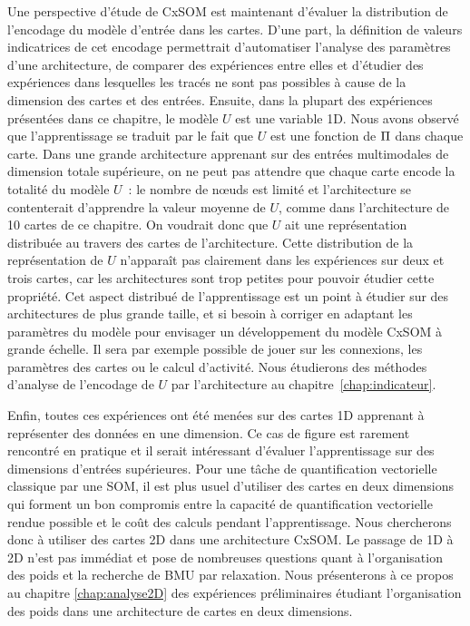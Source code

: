 \documentclass[../main]{subfiles}
\begin{document}
Une perspective d'étude de CxSOM est maintenant d'évaluer la distribution de l'encodage du modèle d'entrée dans les cartes. 
D'une part, la définition de valeurs indicatrices de cet encodage permettrait d'automatiser l'analyse des paramètres d'une architecture, de comparer des expériences entre elles et d'étudier des expériences dans lesquelles les tracés ne sont pas possibles à cause de la dimension des cartes et des entrées.
Ensuite, dans la plupart des expériences présentées dans ce chapitre, le modèle $U$ est une variable 1D. 
Nous avons observé que l'apprentissage se traduit par le fait que $U$ est une fonction de $\Pi$ dans chaque carte.
Dans une grande architecture apprenant sur des entrées multimodales de dimension totale supérieure, on ne peut pas attendre que chaque carte encode la totalité du modèle $U$~: le nombre de n\oe{}uds est limité et l'architecture se contenterait d'apprendre la valeur moyenne de $U$, comme dans l'architecture de 10 cartes de ce chapitre.
On voudrait donc que $U$ ait une représentation distribuée au travers des cartes de l'architecture. 
Cette distribution de la représentation de $U$ n'apparaît pas clairement dans les expériences sur deux et trois cartes, car les architectures sont trop petites pour pouvoir étudier cette propriété.
Cet aspect distribué de l'apprentissage est un point à étudier sur des architectures de plus grande taille, et si besoin à corriger en adaptant les paramètres du modèle pour envisager un développement du modèle CxSOM à grande échelle. 
Il sera par exemple possible de jouer sur les connexions, les paramètres des cartes ou le calcul d'activité.
Nous étudierons des méthodes d'analyse de l'encodage de $U$ par l'architecture au chapitre~\ref{chap:indicateur}.

Enfin, toutes ces expériences ont été menées sur des cartes 1D apprenant à représenter des données en une dimension. Ce cas de figure est rarement rencontré en pratique et il serait intéressant d'évaluer l'apprentissage sur des dimensions d'entrées supérieures. Pour une tâche de quantification vectorielle classique par une SOM, il est plus usuel d'utiliser des cartes en deux dimensions qui forment un bon compromis entre la capacité de quantification vectorielle rendue possible et le coût des calculs pendant l'apprentissage. Nous chercherons donc à utiliser des cartes 2D dans une architecture CxSOM. Le passage de 1D à 2D n'est pas immédiat et pose de nombreuses questions quant à l'organisation des poids et la recherche de BMU par relaxation. 
Nous présenterons à ce propos au chapitre \ref{chap:analyse2D} des expériences préliminaires étudiant l'organisation des poids dans une architecture de cartes en deux dimensions.

\ifSubfilesClassLoaded{
    \printbibliography
}{}
\end{document}

